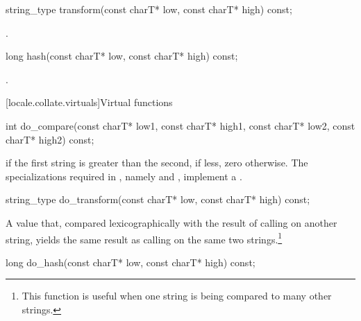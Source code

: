 %
\begin{itemdecl}
string_type transform(const charT* low, const charT* high) const;
\end{itemdecl}

\begin{itemdescr}
\pnum
\returns
{}.
\end{itemdescr}

%
\begin{itemdecl}
long hash(const charT* low, const charT* high) const;
\end{itemdecl}

\begin{itemdescr}
\pnum
\returns
{}.
\end{itemdescr}

[locale.collate.virtuals]{Virtual functions}

%
\begin{itemdecl}
int do_compare(const charT* low1, const charT* high1,
               const charT* low2, const charT* high2) const;
\end{itemdecl}

\begin{itemdescr}
\pnum
\returns
{}
if the first string is greater than the second,
if less, zero otherwise.
The specializations required in , namely
and
,
implement
a .
\end{itemdescr}

%
\begin{itemdecl}
string_type do_transform(const charT* low, const charT* high) const;
\end{itemdecl}

\begin{itemdescr}
\pnum
\returns
A
value that, compared lexicographically with the result of calling
on another string, yields the same result as calling
on the same two strings.\footnote{This function is useful when one string is
being compared to many other strings.}
\end{itemdescr}

%
\begin{itemdecl}
long do_hash(const charT* low, const charT* high) const;
\end{itemdecl}


